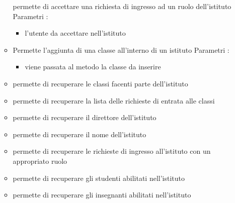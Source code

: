 \begin{itemize}
\begin{itemize}
permette di accettare una richiesta di ingresso ad un ruolo dell'istituto
\newline
Parametri :
\begin{itemize}
\item {}
\newline
l'utente da accettare nell'istituto
\end{itemize}
\item {}
\newline
Permette l'aggiunta di una classe all'interno di un istituto
\newline
Parametri :
\begin{itemize}
\item {}
\newline
viene passata al metodo la classe da inserire
\end{itemize}
\item {}
\newline
permette di recuperare le classi facenti parte dell'istituto
\newline
\item {}
\newline
permette di recuperare la lista delle richieste di entrata alle classi
\newline
\item {}
\newline
permette di recuperare il direttore dell'istituto
\newline
\item {}
\newline
permette di recuperare il nome dell'istituto
\newline
\item {}
\newline
permette di recuperare le richieste di ingresso all'istituto con un appropriato ruolo
\newline
\item {}
\newline
permette di recuperare gli studenti abilitati nell'istituto
\newline
\item {}
\newline
permette di recuperare gli insegnanti abilitati nell'istituto
\newline

\end{itemize}
\end{itemize}
